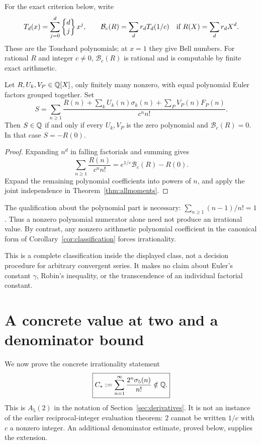 For the exact criterion below, write
\[
 T_d(x)=\sum_{j=0}^d\left\{\begin{matrix}d\\j\end{matrix}\right\}x^j,\qquad
 \mathcal B_c(R)=\sum_dr_dT_d(1/c)
 \quad\text{if }R(X)=\sum_dr_dX^d.
\]
These are the Touchard polynomials; at $x=1$ they give Bell numbers.
For rational $R$ and integer $c\ne0$, $\mathcal B_c(R)$ is rational
and is computable by finite exact arithmetic.

\begin{corollary}
\label{cor:classification}
Let $R,U_k,V_P\in\mathbb Q[X]$, only finitely many nonzero, with equal
polynomial Euler factors grouped together. Set
\[
 S=\sum_{n\geq1}\frac{
 R(n)+\sum_kU_k(n)\sigma_k(n)+\sum_PV_P(n)F_P(n)}{c^n n!}.
\]
Then $S\in\mathbb Q$ if and only if every $U_k,V_P$ is the zero
polynomial and $\mathcal B_c(R)=0$. In that case $S=-R(0)$.
\end{corollary}
\begin{proof}
Expanding $n^d$ in falling factorials and summing gives
\[
 \sum_{n\geq1}\frac{R(n)}{c^n n!}
       =e^{1/c}\mathcal B_c(R)-R(0).
\]
Expand the remaining polynomial coefficients into powers of $n$,
and apply the joint independence in Theorem~\ref{thm:allmoments}.
\end{proof}

The qualification about the polynomial part is necessary:
$\sum_{n\geq1}(n-1)/n!=1$. Thus a nonzero polynomial numerator
alone need not produce an irrational value. By contrast, any
nonzero arithmetic polynomial coefficient in the canonical form
of Corollary~\ref{cor:classification} forces irrationality.

This is a complete classification inside the displayed class, not
a decision procedure for arbitrary convergent series. It makes no
claim about Euler's constant $\gamma$, Robin's inequality, or the
transcendence of an individual factorial constant.


\section{A concrete value at two and a denominator bound}
\label{sec:dyadic}
We now prove the concrete irrationality statement
\begin{equation}\label{eq:concrete-two}
 \boxed{C_*:=\sum_{n=1}^{\infty}\frac{2^n\sigma_5(n)}{n!}\notin\mathbb Q.}
\end{equation}
This is $A_5(2)$ in the notation of Section~\ref{sec:derivatives}.
It is not an instance of the earlier reciprocal-integer evaluation
theorem: $2$ cannot be written $1/c$ with $c$ a nonzero integer.
An additional denominator estimate, proved below, supplies the extension.

